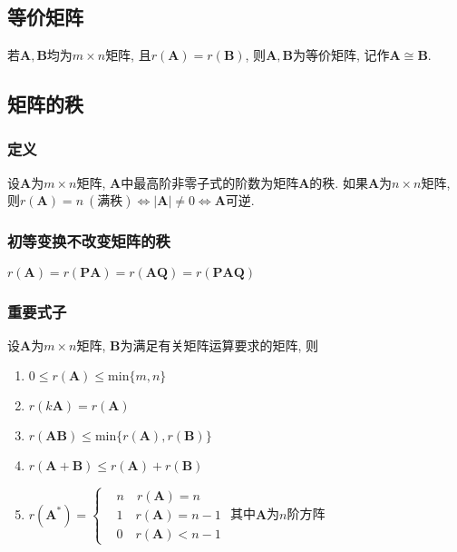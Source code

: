 \subsection{等价矩阵}
若$ \bm{A}, \bm{B} $均为$ m\times n $矩阵, 且$ r(\bm{A})=r(\bm{B}) $, 则$ \bm{A}, \bm{B} $为等价矩阵, 记作$ \bm{A}\cong\bm{B} $.
\subsection{矩阵的秩}
\subsubsection{定义}
设$ \bm{A} $为$ m\times n $矩阵, $ \bm{A} $中最高阶非零子式的阶数为矩阵$ \bm{A} $的秩.
如果$ \bm{A} $为$ n\times n $矩阵, 则$ r(\bm{A})=n\ (\text{满秩})\Leftrightarrow |\bm{A}|\neq 0\Leftrightarrow \bm{A}\text{可逆} $.
\subsubsection{初等变换不改变矩阵的秩}
$ r(\bm{A})=r(\bm{PA})=r(\bm{AQ})=r(\bm{PAQ}) $
\subsubsection{重要式子}
设$ \bm{A} $为$ m\times n $矩阵, $ \bm{B} $为满足有关矩阵运算要求的矩阵, 则
\begin{enumerate}
	\item $ 0\le r(\bm{A})\le \text{min}\{m,n\} $
	\item $ r(k\bm{A})=r(\bm{A}) $
	\item $ r(\bm{A}\bm{B})\le \text{min}\{r(\bm{A}),r(\bm{B})\} $
	\item $ r(\bm{A}+\bm{B})\le r(\bm{A})+r(\bm{B}) $
	\item $ r(\bm{A}^{*})=\left\{\begin{aligned}
			& n\quad r(\bm{A})=n \\
			& 1\quad r(\bm{A})=n-1 \\
			& 0\quad r(\bm{A})<n-1
		\end{aligned}\right.$ 其中$ \bm{A} $为$ n $阶方阵
\end{enumerate}
